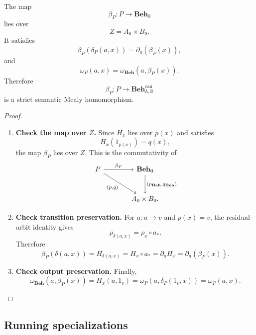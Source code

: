 \begin{proposition}
\label{prop:behaviour-assignment}
    The map
    \[
        \beta_P:P\to\mathbf{Beh}_0
    \]
    lies over
    \[
        Z=A_0\times B_0.
    \]
    It satisfies
    \[
        \beta_P(\delta_P(a,x))
        =
        \partial_a(\beta_P(x)),
    \]
    and
    \[
        \omega_P(a,x)
        =
        \omega_{\mathbf{Beh}}(a,\beta_P(x)).
    \]
    Therefore
    \[
        \beta_P:P\to\mathbf{Beh}^{\mathrm{can}}_{\mathbb A,\mathbb B}
    \]
    is a strict semantic Mealy homomorphism.
\end{proposition}
\begin{proof}
    \leavevmode
    \begin{enumerate}
        \item \textbf{Check the map over \(Z\).} Since \(H_x\) lies over \(p(x)\) and satisfies
        \[
            H_x(1_{p(x)})=q(x),
        \]
        the map \(\beta_P\) lies over \(Z\). This is the commutativity of
        \[
            \begin{tikzcd}[column sep=large, row sep=large]
                    P
                        \arrow[r, "\beta_P"]
                        \arrow[dr, "{(p,q)}"']
                &
                    \mathbf{Beh}_0
                        \arrow[d, "{(p_{\mathbf{Beh}},q_{\mathbf{Beh}})}"]
                \\
                &
                    A_0\times B_0.
            \end{tikzcd}
        \]

        \item \textbf{Check transition preservation.} For \(a:u\to v\) and \(p(x)=v\), the residual-orbit identity gives
        \[
            \rho_{\delta(a,x)}=\rho_x\circ a_*.
        \]
        Therefore
        \[
            \beta_P(\delta(a,x))
            =
            H_{\delta(a,x)}
            =
            H_x\circ a_*
            =
            \partial_aH_x
            =
            \partial_a(\beta_P(x)).
        \]

        \item \textbf{Check output preservation.} Finally,
        \[
            \omega_{\mathbf{Beh}}(a,\beta_P(x))
            =
            H_x(a,1_v)
            =
            \omega_P(a,\delta_P(1_v,x))
            =
            \omega_P(a,x).
        \]
    \end{enumerate}
\end{proof}

\subsection{Running specializations}
\label{subsec:residual-semantics-running-specializations}

